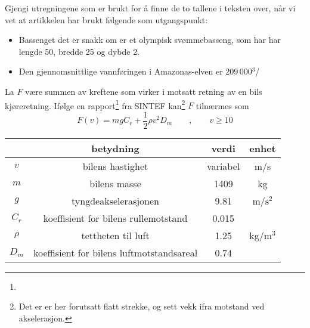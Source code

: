 Gjengi utregningene som er brukt for å finne de to tallene i teksten over, når vi vet at artikkelen har brukt følgende som utgangspunkt:
\begin{itemize}
\item Bassenget det er snakk om er et olympisk svømmebasseng, som har har lengde 50, bredde 25 og dybde 2.
\item Den gjennomsnittlige vannføringen i Amazonas-elven er 209\,000$ ^3 $/
\end{itemize}
\newpage
{}

La $ F $ være summen av kreftene som virker i motsatt retning av en bils kjøreretning. Ifølge en rapport\footnote{} fra SINTEF kan\footnote{Det er er her forutsatt flatt strekke, og sett vekk ifra motstand ved akselerasjon.} $ F $ tilnærmes som
\[ F(v)= mgC_r+\frac{1}{2}\rho v^2 D_m\qquad,\qquad v\geq10\]
\begin{center}
	\begin{tabular}{c|c|c|c}
		& \textbf{betydning} & \textbf{verdi}&\textbf{enhet}  \\ \hline
		$ v $ & bilens hastighet & variabel& m/s \\
		$ m $& bilens masse\footnotemark & 1409 & kg\\
		$ g $& tyngdeakselerasjonen & 9.81 & m/$ \text{s}^2 $ \\
		$ C_r $ & koeffisient for bilens rullemotstand & 0.015\\
		$ \rho $ & tettheten til luft & 1.25 & kg/$ \text{m}^3 $ \\
		$ D_m $& koeffisient for bilens luftmotstandsareal\footnotemark &0.74
	\end{tabular}
\end{center}


